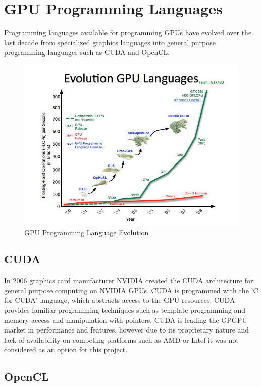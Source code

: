\section{GPU Programming Languages}

Programming languages available for programming GPUs have evolved over the last
decade from specialized graphics languages into general purpose programming
languages such as CUDA and OpenCL.\cite{Owens2007}

\begin{figure}[!htc]
 		\centering
		\includegraphics[scale=1.0]{figures/frogs.jpg}
        \caption{ GPU Programming Language Evolution \cite{Bollig} }
        \label{fig:frogs}
\end{figure}



\subsection{CUDA}
In 2006 graphics card manufacturer NVIDIA created the CUDA architecture 
for general purpose computing on NVIDIA GPUs. CUDA is programmed with the 'C
for CUDA' language, which abstracts access to the GPU resources. CUDA provides
familiar programming techniques such as template programming and memory access
and manipulation with pointers. CUDA is leading the GPGPU market in performance
and features, however due to its proprietary nature and lack of availability on
competing platforms such as AMD or Intel it was not considered as an option for
this project.


\subsection{OpenCL}

